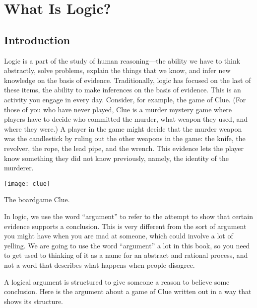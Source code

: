 \chapter{What Is Logic?}\label{ch:what_is_logic}


\section{Introduction}\label{sec:what_is_logic}

Logic is a part of the study of human reasoning---the ability we have to think abstractly, solve problems, explain the things that we know, and infer new knowledge on the basis of evidence. Traditionally, logic has focused on the last of these items, the ability to make inferences on the basis of evidence. This is an activity you engage in every day. Consider, for example, the game of Clue. (For those of you who have never played, Clue is a murder mystery game where players have to decide who committed the murder, what weapon they used, and where they were.) A player in the game might decide that the murder weapon was the candlestick by ruling out the other weapons in the game: the knife, the revolver, the rope, the lead pipe, and the wrench. This evidence lets the player know something they did not know previously, namely, the identity of the murderer.\begin{marginfigure}\texttt{[image: clue]}\caption{The boardgame Clue.}\end{marginfigure}

In logic, we use the word ``argument'' to refer to the attempt to show that certain evidence supports a conclusion. This is very different from the sort of argument you might have when you are mad at someone, which could involve a lot of yelling. We are going to use the word ``argument'' a lot in this book, so you need to get used to thinking of it as a name for an abstract and rational process, and not a word that describes what happens when people disagree.

A logical argument is structured to give someone a reason to believe some conclusion. Here is the argument about a game of Clue written out in a way that shows its structure.

\begin{kormanize}
\end{kormanize}

